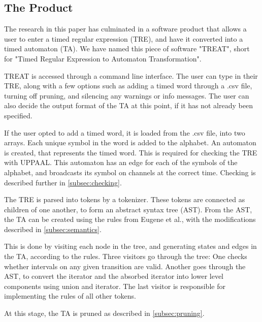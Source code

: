 \subsection{The Product}\label{subsec:theProduct}
The research in this paper has culminated in a software product that allows a user to enter a timed regular expression (TRE), and have it converted into a timed automaton (TA).
We have named this piece of software "TREAT", short for "Timed Regular Expression to Automaton Transformation".

TREAT is accessed through a command line interface. The user can type in their TRE, along with a few options such as adding a timed word through a .csv file, turning off pruning, and silencing any warnings or info messages.
The user can also decide the output format of the TA at this point, if it has not already been specified. 

If the user opted to add a timed word, it is loaded from the .csv file, into two arrays. Each unique symbol in the word is added to the alphabet.
An automaton is created, that represents the timed word. This is required for checking the TRE with UPPAAL. This automaton has an edge for each of the symbols of the alphabet, and broadcasts its symbol on channels at the correct time. Checking is described further in \cref{subsec:checking}.

The TRE is parsed into tokens by a tokenizer. These tokens are connected as children of one another, to form an abstract syntax tree (AST). 
From the AST, the TA can be created using the rules from Eugene et al., with the modifications described in \cref{subsec:semantics}.

This is done by visiting each node in the tree, and generating states and edges in the TA, according to the rules. Three visitors go through the tree: One checks whether intervals on any given transition are valid. Another goes through the AST, to convert the iterator and the absorbed iterator into lower level components using union and iterator. The last visitor is responsible for implementing the rules of all other tokens.

At this stage, the TA is pruned as described in \cref{subsec:pruning}. 

